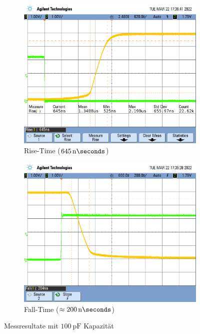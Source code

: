 \documentclass[../main.tex]{subfiles}
\begin{document}
\newpage

\begin{figure}[h]
    \centering
    \begin{subfigure}[b]{0.45\textwidth}
        \centering
        \includegraphics[width=\textwidth]{assets/task3_square/SquareRise_100pF.png}
        \caption{Rise-Time ($\SI{645}{\nano\seconds}$)}
        \label{fig:square_rise}
    \end{subfigure}
    \hfill
    \begin{subfigure}[b]{0.45\textwidth}
        \centering
        \includegraphics[width=\textwidth]{assets/task3_square/SquareFall_100pF.png}
        \caption{Fall-Time ($\approx\SI{200}{\nano\seconds}$)}
        \label{fig:square_fall}
    \end{subfigure}
    \caption{Messresultate mit $\SI{100}{\pico\farad}$ Kapazität}
    \label{fig:square_no_cap}
\end{figure}
\end{document}
